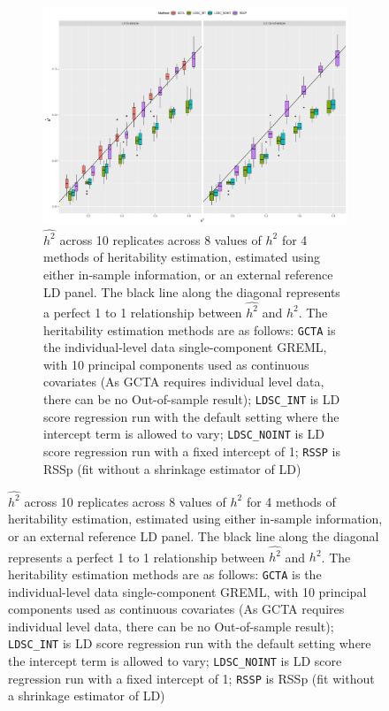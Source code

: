 

  \begin{figure}
      \centering
  \begin{subfigure}[t]{\textwidth}
    \centering
    \includegraphics[width=.9\linewidth]{img/rsspnld_v_ldsc_v_gcta.png}
    \caption{$\hat{h^2}$ across 10 replicates across 8 values of $h^2$ for 4 methods of heritability estimation, estimated using either in-sample information, or an external reference LD panel. The black line along the diagonal represents a perfect 1 to 1 relationship between $\hat{h^2}$ and $h^2$.    The heritability estimation methods are as follows: 
    \texttt{GCTA} is the individual-level data single-component GREML, with 10 principal components used as continuous covariates (As GCTA requires individual level data, there can be no Out-of-sample result);
    \texttt{LDSC\_INT} is LD score regression \cite{ldsc} run with the default setting where the intercept term is allowed to vary; 
    \texttt{LDSC\_NOINT} is LD score regression run with a fixed intercept of 1;
    \texttt{RSSP} is RSSp (fit without a shrinkage estimator of LD)}\label{fig:rssp_method_comparison}
  \end{subfigure}
\end{figure}



